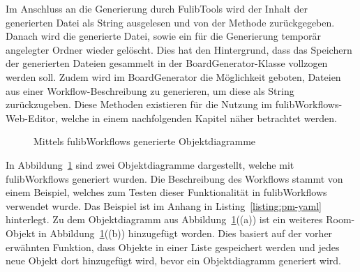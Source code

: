 Im Anschluss an die Generierung durch FulibTools wird der Inhalt der generierten Datei als String ausgelesen und von der Methode zurückgegeben.
Danach wird die generierte Datei, sowie ein für die Generierung temporär angelegter Ordner wieder gelöscht.
Dies hat den Hintergrund, dass das Speichern der generierten Dateien gesammelt in der BoardGenerator-Klasse vollzogen werden soll.
Zudem wird im BoardGenerator die Möglichkeit geboten, Dateien aus einer Workflow-Beschreibung zu generieren, um diese als String zurückzugeben.
Diese Methoden existieren für die Nutzung im fulibWorkflows-Web-Editor, welche in einem nachfolgenden Kapitel näher betrachtet werden.

\begin{figure}[h]
    \centering
    \qquad
    \caption{Mittels fulibWorkflows generierte Objektdiagramme}%
    \label{fig:generated-object}%
\end{figure}

In Abbildung~\ref{fig:generated-object} sind zwei Objektdiagramme dargestellt, welche mit fulibWorkflows generiert wurden.
Die Beschreibung des Workflows stammt von einem Beispiel, welches zum Testen dieser Funktionalität in fulibWorkflows verwendet wurde.
Das Beispiel ist im Anhang in Listing~\ref{listing:pm-yaml} hinterlegt.
Zu dem Objektdiagramm aus Abbildung~\ref{fig:generated-object}((a)) ist ein weiteres Room-Objekt in Abbildung~\ref{fig:generated-object}((b)) hinzugefügt worden.
Dies basiert auf der vorher erwähnten Funktion, dass Objekte in einer Liste gespeichert werden und jedes neue Objekt dort hinzugefügt wird, bevor ein Objektdiagramm generiert wird.

